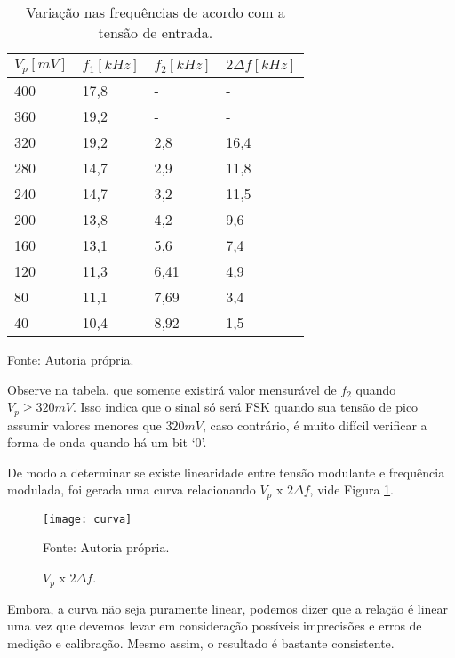 \begin{table}[H]
    \centering
    \caption{Variação nas frequências de acordo com a tensão de entrada.}
    \begin{tabular}{|l|l|l|l|}
        \hline
        $V_p [mV]$ & $f_1 [kHz]$  & $f_2 [kHz]$ & $2 \Delta{f} [kHz]$ \\ 
        \hline
        400 & 17,8 & - & - \\ 
        \hline
        360 & 19,2 & - & - \\ 
        \hline
        320 & 19,2 & 2,8 & 16,4 \\ 
        \hline
        280 & 14,7 & 2,9 & 11,8 \\ 
        \hline
        240 & 14,7 & 3,2 & 11,5 \\ 
        \hline
        200 & 13,8 & 4,2 & 9,6 \\ 
        \hline
        160 & 13,1 & 5,6 & 7,4 \\ 
        \hline
        120 & 11,3 & 6,41 & 4,9 \\ 
        \hline
        80 & 11,1 & 7,69 & 3,4 \\ 
        \hline
        40 & 10,4 & 8,92 & 1,5 \\ 
        \hline
    \end{tabular}
\label{tab:400}

\small Fonte:  Autoria própria.
\end{table}


Observe na tabela, que somente existirá valor mensurável de $f_2$ quando $V_p \geq 320 mV$. Isso indica que o sinal só será FSK quando sua tensão de pico assumir valores menores que $320 mV$, caso contrário, é muito difícil verificar a forma de onda quando há um bit ‘0’.

De modo a determinar se existe linearidade entre tensão modulante e frequência modulada, foi gerada uma curva relacionando $V_p$ x $2 \Delta{f}$, vide Figura \ref{fig:df}.

\begin{figure}[H]
    \centering
    \caption{ $V_p$ x $2 \Delta{f}$.}
    \texttt{[image: curva]}
    \label{fig:df}
    
    \small Fonte:  Autoria própria.
\end{figure}

Embora, a curva não seja puramente linear, podemos dizer que a relação é linear uma vez que devemos levar em consideração possíveis imprecisões e erros de medição e calibração. Mesmo assim, o resultado é bastante consistente. 

